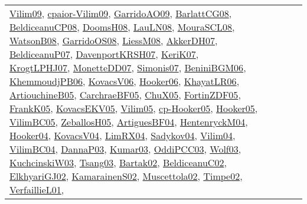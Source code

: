 {\begin{longtable}{llp{6cm}p{6cm}p{6cm}}
\href{papers/Vilim09.pdf}{Vilim09}\cite{Vilim09}, \href{papers/cpaior-Vilim09.pdf}{cpaior-Vilim09}\cite{cpaior-Vilim09}, \href{articles/GarridoAO09.pdf}{GarridoAO09}\cite{GarridoAO09}, \href{papers/BarlattCG08.pdf}{BarlattCG08}\cite{BarlattCG08}, \href{papers/BeldiceanuCP08.pdf}{BeldiceanuCP08}\cite{BeldiceanuCP08}, \href{papers/DoomsH08.pdf}{DoomsH08}\cite{DoomsH08}, \href{papers/LauLN08.pdf}{LauLN08}\cite{LauLN08}, \href{papers/MouraSCL08.pdf}{MouraSCL08}\cite{MouraSCL08}, \href{papers/WatsonB08.pdf}{WatsonB08}\cite{WatsonB08}, \href{articles/GarridoOS08.pdf}{GarridoOS08}\cite{GarridoOS08}, \href{articles/LiessM08.pdf}{LiessM08}\cite{LiessM08}, \href{papers/AkkerDH07.pdf}{AkkerDH07}\cite{AkkerDH07}, \href{papers/BeldiceanuP07.pdf}{BeldiceanuP07}\cite{BeldiceanuP07}, \href{papers/DavenportKRSH07.pdf}{DavenportKRSH07}\cite{DavenportKRSH07}, \href{papers/KeriK07.pdf}{KeriK07}\cite{KeriK07}, \href{papers/KrogtLPHJ07.pdf}{KrogtLPHJ07}\cite{KrogtLPHJ07}, \href{papers/MonetteDD07.pdf}{MonetteDD07}\cite{MonetteDD07}, \href{articles/Simonis07.pdf}{Simonis07}\cite{Simonis07}, \href{papers/BeniniBGM06.pdf}{BeniniBGM06}\cite{BeniniBGM06}, \href{papers/KhemmoudjPB06.pdf}{KhemmoudjPB06}\cite{KhemmoudjPB06}, \href{papers/KovacsV06.pdf}{KovacsV06}\cite{KovacsV06}, \href{articles/Hooker06.pdf}{Hooker06}\cite{Hooker06}, \href{articles/KhayatLR06.pdf}{KhayatLR06}\cite{KhayatLR06}, \href{papers/ArtiouchineB05.pdf}{ArtiouchineB05}\cite{ArtiouchineB05}, \href{papers/CarchraeBF05.pdf}{CarchraeBF05}\cite{CarchraeBF05}, \href{papers/ChuX05.pdf}{ChuX05}\cite{ChuX05}, \href{papers/FortinZDF05.pdf}{FortinZDF05}\cite{FortinZDF05}, \href{papers/FrankK05.pdf}{FrankK05}\cite{FrankK05}, \href{papers/KovacsEKV05.pdf}{KovacsEKV05}\cite{KovacsEKV05}, \href{papers/Vilim05.pdf}{Vilim05}\cite{Vilim05}, \href{papers/cp-Hooker05.pdf}{cp-Hooker05}\cite{cp-Hooker05}, \href{articles/Hooker05.pdf}{Hooker05}\cite{Hooker05}, \href{articles/VilimBC05.pdf}{VilimBC05}\cite{VilimBC05}, \href{articles/ZeballosH05.pdf}{ZeballosH05}\cite{ZeballosH05}, \href{papers/ArtiguesBF04.pdf}{ArtiguesBF04}\cite{ArtiguesBF04}, \href{papers/HentenryckM04.pdf}{HentenryckM04}\cite{HentenryckM04}, \href{papers/Hooker04.pdf}{Hooker04}\cite{Hooker04}, \href{papers/KovacsV04.pdf}{KovacsV04}\cite{KovacsV04}, \href{papers/LimRX04.pdf}{LimRX04}\cite{LimRX04}, \href{papers/Sadykov04.pdf}{Sadykov04}\cite{Sadykov04}, \href{papers/Vilim04.pdf}{Vilim04}\cite{Vilim04}, \href{papers/VilimBC04.pdf}{VilimBC04}\cite{VilimBC04}, \href{papers/DannaP03.pdf}{DannaP03}\cite{DannaP03}, \href{papers/Kumar03.pdf}{Kumar03}\cite{Kumar03}, \href{papers/OddiPCC03.pdf}{OddiPCC03}\cite{OddiPCC03}, \href{papers/Wolf03.pdf}{Wolf03}\cite{Wolf03}, \href{articles/KuchcinskiW03.pdf}{KuchcinskiW03}\cite{KuchcinskiW03}, \href{articles/Tsang03.pdf}{Tsang03}\cite{Tsang03}, \href{papers/Bartak02.pdf}{Bartak02}\cite{Bartak02}, \href{papers/BeldiceanuC02.pdf}{BeldiceanuC02}\cite{BeldiceanuC02}, \href{papers/ElkhyariGJ02.pdf}{ElkhyariGJ02}\cite{ElkhyariGJ02}, \href{papers/KamarainenS02.pdf}{KamarainenS02}\cite{KamarainenS02}, \href{papers/Muscettola02.pdf}{Muscettola02}\cite{Muscettola02}, \href{articles/Timpe02.pdf}{Timpe02}\cite{Timpe02}, \href{papers/VerfaillieL01.pdf}{VerfaillieL01}\cite{VerfaillieL01}, 
\end{longtable}}
